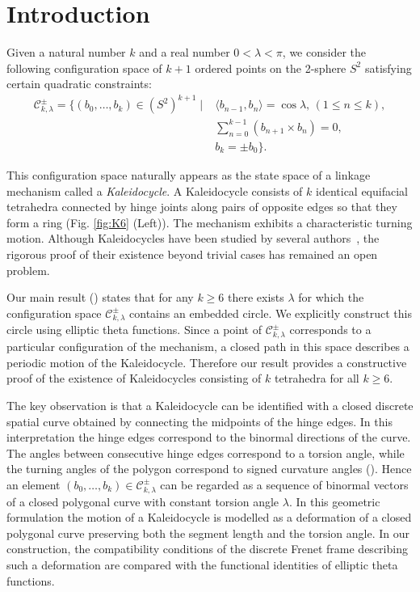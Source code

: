 \documentclass[10pt,leqno]{amsart}
\newcommand{\conf}{\mathcal{C}}
\numberwithin{equation}{section}
\begin{document}
\maketitle
\section{Introduction}\label{sec:intro}

Given a natural number $k$ and a real number $0 <\lambda<\pi$, 
we consider the following configuration space of $k+1$ ordered points on the 2-sphere $S^2$ satisfying certain quadratic constraints:
\begin{align}\label{eq:configuration_binormal}
\conf^\pm_{k,\lambda} = \{(b_0,\ldots,b_k)\in (S^2)^{k+1} \mid & \langle b_{n-1}, b_n \rangle = \cos\lambda, \, (1\le n\le k), \\
& \sum_{n=0}^{k-1}(b_{n+1}\times b_{n}) = 0, \nonumber\\
& b_k=\pm b_0\}. \nonumber 
\end{align}

This configuration space naturally appears as the state space of a linkage mechanism called a \emph{Kaleidocycle}.
A Kaleidocycle consists of $k$ identical equifacial tetrahedra connected by hinge joints along pairs of opposite edges so that they form a ring (Fig. \ref{fig:K6} (Left)).
The mechanism exhibits a characteristic turning motion.
Although Kaleidocycles have been studied by several authors~\cite{CHEN20052287,FG:mobility,safsten2016analyzing,JF:Kaleidocycle}, the rigorous proof of their existence beyond trivial cases has remained an open problem.

Our main result () states that for any $k\ge6$ there exists $\lambda$ for which the configuration space $\conf^\pm_{k,\lambda}$ contains an embedded circle.
We explicitly construct this circle using elliptic theta functions.
Since a point of $\conf^\pm_{k,\lambda}$ corresponds to a particular configuration of the mechanism, a closed path in this space describes a periodic motion of the Kaleidocycle.
Therefore our result provides a constructive proof of the existence of Kaleidocycles consisting of $k$ tetrahedra for all $k\ge6$.


The key observation is that a Kaleidocycle can be identified with a closed discrete spatial curve obtained by connecting the midpoints of the hinge edges.
In this interpretation the hinge edges correspond to the binormal directions of the curve.
The angles between consecutive hinge edges correspond to a torsion angle, while the turning angles of the polygon correspond to signed curvature angles ().
Hence an element $(b_0,\ldots,b_k)\in \conf^\pm_{k,\lambda}$ can be regarded as a sequence of binormal vectors of a closed polygonal curve with constant torsion angle $\lambda$.
In this geometric formulation the motion of a Kaleidocycle is modelled as a deformation of a closed polygonal curve preserving both the segment length and the torsion angle.
In our construction, the compatibility conditions of the discrete Frenet frame describing such a deformation are compared with the functional identities of elliptic theta functions.
\end{document}
